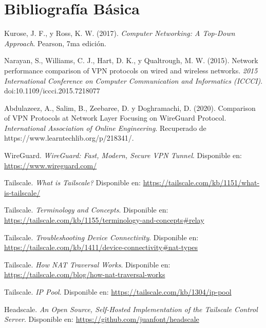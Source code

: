 \documentclass[letterpaper,12pt,oneside]{article}
\begin{document}
    \section{Bibliografía Básica}

    \begin{thebibliography}{99}
    
    Kurose, J. F., y Ross, K. W. (2017). \textit{Computer Networking: A Top-Down Approach}. Pearson, 7ma edición.
    
    Narayan, S., Williams, C. J., Hart, D. K., y Qualtrough, M. W. (2015). Network performance comparison of VPN protocols on wired and wireless networks. \textit{2015 International Conference on Computer Communication and Informatics (ICCCI)}. doi:10.1109/iccci.2015.7218077
    
    Abdulazeez, A., Salim, B., Zeebaree, D. y Doghramachi, D. (2020). Comparison of VPN Protocols at Network Layer Focusing on WireGuard Protocol. \textit{International Association of Online Engineering}. Recuperado de https://www.learntechlib.org/p/218341/.
    
    WireGuard. \textit{WireGuard: Fast, Modern, Secure VPN Tunnel}. Disponible en: \url{https://www.wireguard.com/}
    
    Tailscale. \textit{What is Tailscale?} Disponible en: \url{https://tailscale.com/kb/1151/what-is-tailscale/}
    
    Tailscale. \textit{Terminology and Concepts}. Disponible en: \url{https://tailscale.com/kb/1155/terminology-and-concepts#relay}
    
    Tailscale. \textit{Troubleshooting Device Connectivity}. Disponible en: \url{https://tailscale.com/kb/1411/device-connectivity#nat-types}
    
    Tailscale. \textit{How NAT Traversal Works}. Disponible en: \url{https://tailscale.com/blog/how-nat-traversal-works}
    
    Tailscale. \textit{IP Pool}. Disponible en: \url{https://tailscale.com/kb/1304/ip-pool}
    
    Headscale. \textit{An Open Source, Self-Hosted Implementation of the Tailscale Control Server}. Disponible en: \url{https://github.com/juanfont/headscale}
    

\end{thebibliography}
\end{document}
